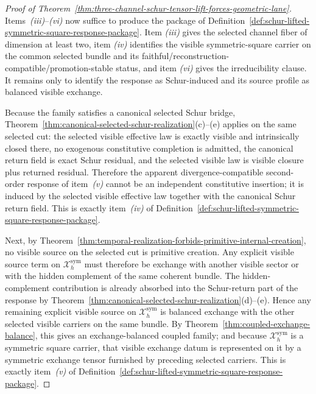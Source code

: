 \begin{proof}[Proof of Theorem~\ref{thm:three-channel-schur-tensor-lift-forces-geometric-lane}]
\label{proof:thm:three-channel-schur-tensor-lift-forces-geometric-lane}
Items~\emph{(iii)}--\emph{(vi)} now suffice to produce the package of
Definition~\ref{def:schur-lifted-symmetric-square-response-package}. Item
\emph{(iii)} gives the selected channel fiber of dimension at least two, item
\emph{(iv)} identifies the visible symmetric-square carrier on the common
selected bundle and its faithful/reconstruction-compatible/promotion-stable
status, and item \emph{(vi)} gives the irreducibility clause. It remains only
to identify the response as Schur-induced and its source profile as balanced
visible exchange.

Because the family satisfies a canonical selected Schur bridge,
Theorem~\ref{thm:canonical-selected-schur-realization}(c)--(e) applies on the
same selected cut: the selected visible effective law is exactly visible and
intrinsically closed there, no exogenous constitutive completion is admitted,
the canonical return field is exact Schur residual, and the selected visible
law is visible closure plus returned residual. Therefore the apparent
divergence-compatible second-order response of item~\emph{(v)} cannot be an
independent constitutive insertion; it is induced by the selected visible
effective law together with the canonical Schur return field. This is exactly
item~\emph{(iv)} of
Definition~\ref{def:schur-lifted-symmetric-square-response-package}.

Next, by
Theorem~\ref{thm:temporal-realization-forbids-primitive-internal-creation}, no
visible source on the selected cut is primitive creation. Any explicit visible
source term on \(\mathcal X_h^{\mathrm{sym}}\) must therefore be exchange with
another visible sector or with the hidden complement of the same coherent
bundle. The hidden-complement contribution is already absorbed into the
Schur-return part of the response by
Theorem~\ref{thm:canonical-selected-schur-realization}(d)--(e). Hence any
remaining explicit visible source on \(\mathcal X_h^{\mathrm{sym}}\) is
balanced exchange with the other selected visible carriers on the same bundle.
By Theorem~\ref{thm:coupled-exchange-balance}, this gives an exchange-balanced
coupled family; and because \(\mathcal X_h^{\mathrm{sym}}\) is a symmetric
square carrier, that visible exchange datum is represented on it by a
symmetric exchange tensor furnished by preceding selected carriers. This is
exactly item~\emph{(v)} of
Definition~\ref{def:schur-lifted-symmetric-square-response-package}.


\end{proof}
